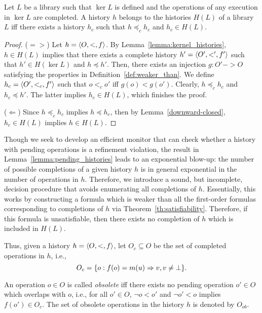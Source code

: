 \begin{lemma}\label{lemma:pending_histories}

Let $L$ be a library such that $\ker L$ is defined and the operations of any execution in $\ker L$ are completed.
A history $h$ belongs to the histories $H(L)$ of a library $L$ iff there exists 
a history $h_c$ such that $h\preceq_c h_c$ and $h_c\in H(L)$.

\end{lemma}

\begin{proof}

($=>$) Let $h=\left\langle {O,<,f} \right\rangle$. By Lemma~\ref{lemma:kernel_histories}, $h\in H(L)$ implies that there exists 
a complete history $h'=\left\langle {O',<',f'} \right\rangle$ such that $h'\in H(\ker L)$ and $h\preceq h'$. 
Then, there exists an injection $g:O' -> O$ 
satisfying the properties in Definition~\ref{def:weaker_than}. We define $h_c=\left\langle {O',<_c,f'} \right\rangle$ 
such that $o<_c o'$ iff $g(o) < g(o')$. Clearly, $h\preceq_c h_c$ and $h_c\preceq h'$. The latter implies
$h_c\in H(L)$, which finishes the proof.

($\Leftarrow$) Since $h\preceq_c h_c$ implies $h\preceq h_c$, then by Lemma~\ref{downward-closed},
$h_c\in H(L)$ implies $h\in H(L)$.
\end{proof}

Though we seek to develop an efficient monitor that can check whether a history with pending
operations is a refinement violation, the result in Lemma~\ref{lemma:pending_histories}
leads to an exponential blow-up: the number of possible completions of a given history $h$
is in general exponential in the number of operations in $h$. Therefore, we introduce
a sound, but incomplete, decision procedure that avoids enumerating all completions of $h$.
Essentially, this works by constructing a formula which is weaker than all the first-order formulas
corresponding to completions of $h$ via Theorem~\ref{th:satisfiability}. Therefore, if this formula
is unsatisfiable, then there exists no completion of $h$ which is included in $H(L)$.

Thus, given a history $h=\left\langle {O,<,f} \right\rangle$, let $O_c\subseteq O$ be the set of completed operations
in $h$, i.e., 
\[
O_c={\{ o:f(o)=m(u)=>v,v\neq\bot \}}.
\]

An operation $o\in O$ is called \emph{obsolete} iff there exists no pending operation $o'\in O$ which 
overlaps with $o$, i.e., for all $o'\in O$, $\neg o<o'$ and $\neg o'<o$ implies
$f(o')\in O_c$. The set of obsolete operations in the history $h$ is denoted by $O_{ob}$.

